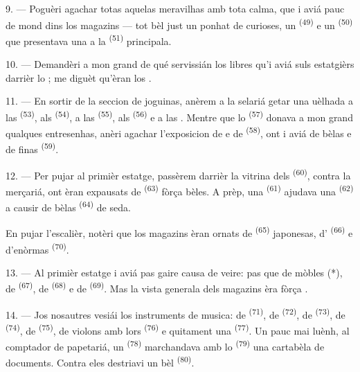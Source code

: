 9. --- Poguèri agachar totas aquelas meravilhas amb tota calma, que i aviá pauc de
mond dins los magazins --- tot bèl just un ponhat de curioses, un 
\textsuperscript{(49)} e un  \textsuperscript{(50)} que
presentava una  a la 
\textsuperscript{(51)} principala.

10. --- Demandèri a mon grand de qué servissián los libres qu'i aviá suls
estatgièrs darrièr lo ; me diguèt qu'èran los .

\VUsaut{3.6mm}
\VUsaut{2.8mm}

11. --- En sortir de la seccion de joguinas, anèrem a la selariá getar una uèlhada
a las  \textsuperscript{(53)}, als 
\textsuperscript{(54)}, a las  \textsuperscript{(55)}, als
 \textsuperscript{(56)} e a las . Mentre que lo
 \textsuperscript{(57)} donava a mon grand qualques
entresenhas, anèri agachar l'exposicion de  e de
 \textsuperscript{(58)}, ont i aviá de bèlas
 e de finas  \textsuperscript{(59)}.

12. --- Per pujar al primièr estatge, passèrem darrièr la vitrina dels
 \textsuperscript{(60)}, contra la merçariá, ont èran expausats de
 \textsuperscript{(63)} fòrça bèles. A prèp, una
 \textsuperscript{(61)} ajudava una 
\textsuperscript{(62)} a causir de bèlas  \textsuperscript{(64)} de
seda.

En pujar l'escalièr, notèri que los magazins èran ornats de 
\textsuperscript{(65)} japonesas, d' \textsuperscript{(66)} e
d'enòrmas  \textsuperscript{(70)}.

13. --- Al primièr estatge i aviá pas gaire causa de veire: pas que de mòbles (*),
de  \textsuperscript{(67)}, de 
\textsuperscript{(68)} e de  \textsuperscript{(69)}. Mas
la vista generala dels magazins èra fòrça .

14. --- Jos nosautres vesiái los instruments de musica: de 
\textsuperscript{(71)}, de  \textsuperscript{(72)}, de
 \textsuperscript{(73)}, de 
\textsuperscript{(74)}, de  \textsuperscript{(75)}, de violons
amb lors  \textsuperscript{(76)} e quitament una  \textsuperscript{(77)}. Un pauc mai luènh, al comptador de papetariá, un
 \textsuperscript{(78)} marchandava amb lo 
\textsuperscript{(79)} una cartabèla de documents. Contra eles destriavi un bèl
 \textsuperscript{(80)}.


